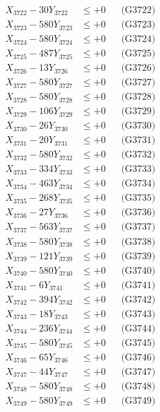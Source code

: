 \documentclass[a4paper,10pt]{article}
\begin{document}
{\begin{align}
X_{3722} - 30Y_{3722} &\leq +0 && \text{(G3722)} \\
X_{3723} - 580Y_{3723} &\leq +0 && \text{(G3723)} \\
X_{3724} - 580Y_{3724} &\leq +0 && \text{(G3724)} \\
X_{3725} - 487Y_{3725} &\leq +0 && \text{(G3725)} \\
X_{3726} - 13Y_{3726} &\leq +0 && \text{(G3726)} \\
X_{3727} - 580Y_{3727} &\leq +0 && \text{(G3727)} \\
X_{3728} - 580Y_{3728} &\leq +0 && \text{(G3728)} \\
X_{3729} - 106Y_{3729} &\leq +0 && \text{(G3729)} \\
X_{3730} - 26Y_{3730} &\leq +0 && \text{(G3730)} \\
\allowbreak
X_{3731} - 20Y_{3731} &\leq +0 && \text{(G3731)} \\
X_{3732} - 580Y_{3732} &\leq +0 && \text{(G3732)} \\
X_{3733} - 334Y_{3733} &\leq +0 && \text{(G3733)} \\
X_{3734} - 463Y_{3734} &\leq +0 && \text{(G3734)} \\
X_{3735} - 268Y_{3735} &\leq +0 && \text{(G3735)} \\
X_{3736} - 27Y_{3736} &\leq +0 && \text{(G3736)} \\
X_{3737} - 563Y_{3737} &\leq +0 && \text{(G3737)} \\
X_{3738} - 580Y_{3738} &\leq +0 && \text{(G3738)} \\
X_{3739} - 121Y_{3739} &\leq +0 && \text{(G3739)} \\
X_{3740} - 580Y_{3740} &\leq +0 && \text{(G3740)} \\
\allowbreak
X_{3741} - 6Y_{3741} &\leq +0 && \text{(G3741)} \\
X_{3742} - 394Y_{3742} &\leq +0 && \text{(G3742)} \\
X_{3743} - 18Y_{3743} &\leq +0 && \text{(G3743)} \\
X_{3744} - 236Y_{3744} &\leq +0 && \text{(G3744)} \\
X_{3745} - 580Y_{3745} &\leq +0 && \text{(G3745)} \\
X_{3746} - 65Y_{3746} &\leq +0 && \text{(G3746)} \\
X_{3747} - 44Y_{3747} &\leq +0 && \text{(G3747)} \\
X_{3748} - 580Y_{3748} &\leq +0 && \text{(G3748)} \\
X_{3749} - 580Y_{3749} &\leq +0 && \text{(G3749)} \\

\end{align}}
\end{document}
